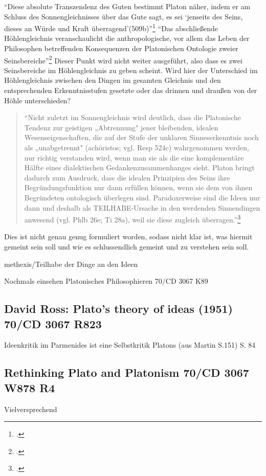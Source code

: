 \documentclass[12pt]{article}
\newcommand*{\zitatblock}[1]{%
    \begin{quote}
    \fontsize{10}{12}\selectfont
    \setlength{\parskip}{1.0em}
    #1
    \end{quote}
}
\begin{document}
\enquote{Diese absolute Transzendenz des Guten bestimmt Platon näher, indem er am Schluss des Sonnengleichnisses über das Gute sagt, es sei \enquote{jenseits des Seins, dieses an Würde und Kraft überragend}(509b)}\footcite[][S. 284]{ThurnerTrennung}
\enquote{Das abschließende Höhlengleichnis veranschaulicht die anthropologische, vor allem das Leben der Philosophen betreffenden Konsequenzen der Platonischen Ontologie zweier Seinsbereiche}\footcite[][S. 284]{ThurnerTrennung} Dieser Punkt wird nicht weiter ausgeführt, also dass es zwei Seinsbereiche im Höhlengleichnis zu geben scheint. Wird hier der Unterschied im Höhlengleichnis zwischen den Dingen im gesamten Gleichnis und den entsprechenden Erkenntnisstufen gesetzte oder das drinnen und draußen von der Höhle unterschieden?
\zitatblock{\enquote{Nicht zuletzt im Sonnengleichnis wird deutlich, dass die Platonische Tendenz zur geistigen „Abtrennung" jener bleibenden, idealen Wesenseigenschaften, die auf der Stufe der unklaren Sinneserkenntnis noch als „unabgetrennt" (achöristos; vgl. Resp 524c) wahrgenommen werden, nur richtig verstanden wird, wenn man sie als die eine komplementäre Hälfte eines dialektischen Gedankenzusammenhanges sieht. Platon bringt dadurch zum Ausdruck, dass die idealen Prinzipien des Seins ihre Begründungsfunktion nur dann erfüllen können, wenn sie dem von ihnen Begründeten ontologisch überlegen sind. Paradoxerweise sind die Ideen nur dann und deshalb als TEILHABE-Ursache in den werdenden Sinnendingen anwesend (vgl. Phlb 26e; Ti 28a), weil sie diese zugleich überragen.}\footcite[][S. 284f.]{ThurnerTrennung}}
Dies ist nicht genau genug formuliert worden, sodass nicht klar ist, was hiermit gemeint sein soll und wie es schlussendlich gemeint und zu verstehen sein soll.

methexis/Teilhabe der Dinge an den Ideen


Nochmals einsehen Platonisches Philosophieren 70/CD 3067 K89

\subsection*{David Ross: Plato's theory of ideas (1951) 70/CD 3067 R823}
Ideenkritik im Parmenides ist eine Selbstkritik Platons (aus Martin S.151) S. 84



\subsection*{Rethinking Plato and Platonism 70/CD 3067 W878 R4 }
Vielversprechend
\end{document}
